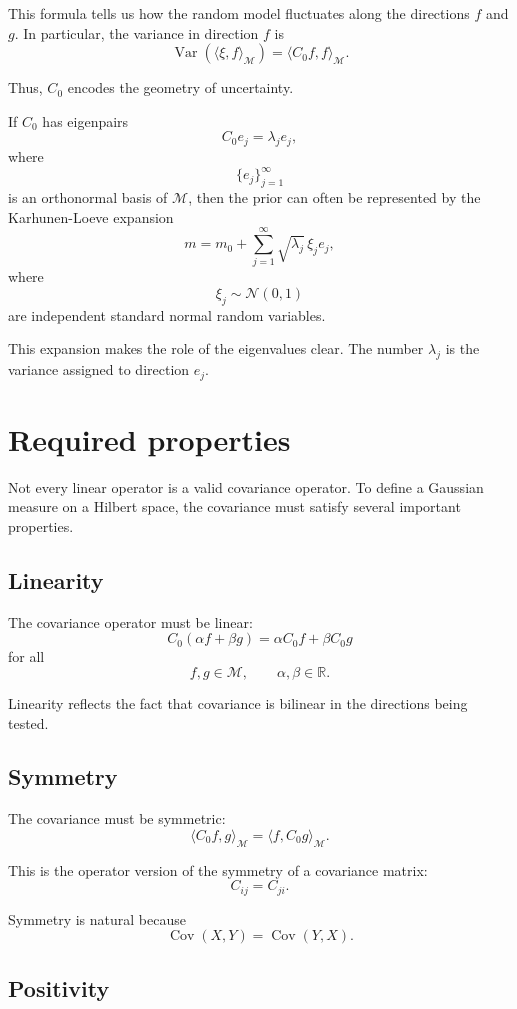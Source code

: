 \documentclass[11pt,a4paper]{book}
\newcommand{\M}{\mathcal{M}}      %
\newcommand{\R}{\mathbb{R}}
\begin{document}
This formula tells us how the random model fluctuates along the directions
$f$ and $g$. In particular, the variance in direction $f$ is
\[
    \operatorname{Var}(\langle \xi,f\rangle_{\M})
    =
    \langle C_0 f,f\rangle_{\M}.
\]

Thus, $C_0$ encodes the geometry of uncertainty.

If $C_0$ has eigenpairs
\[
    C_0 e_j = \lambda_j e_j,
\]
where
\[
    \{e_j\}_{j=1}^{\infty}
\]
is an orthonormal basis of $\M$, then the prior can often be represented by the
Karhunen-Loeve expansion
\[
    m
    =
    m_0
    +
    \sum_{j=1}^{\infty}
    \sqrt{\lambda_j}\,\xi_j e_j,
\]
where
\[
    \xi_j\sim\mathcal{N}(0,1)
\]
are independent standard normal random variables.

This expansion makes the role of the eigenvalues clear. The number
$\lambda_j$ is the variance assigned to direction $e_j$.

\section{Required properties}

Not every linear operator is a valid covariance operator. To define a Gaussian
measure on a Hilbert space, the covariance must satisfy several important
properties.

\subsection{Linearity}

The covariance operator must be linear:
\[
    C_0(\alpha f+\beta g)
    =
    \alpha C_0f+\beta C_0g
\]
for all
\[
    f,g\in\M,
    \qquad
    \alpha,\beta\in\R.
\]

Linearity reflects the fact that covariance is bilinear in the directions being
tested.

\subsection{Symmetry}

The covariance must be symmetric:
\[
    \langle C_0 f,g\rangle_{\M}
    =
    \langle f,C_0 g\rangle_{\M}.
\]

This is the operator version of the symmetry of a covariance matrix:
\[
    C_{ij}=C_{ji}.
\]

Symmetry is natural because
\[
    \operatorname{Cov}(X,Y)
    =
    \operatorname{Cov}(Y,X).
\]

\subsection{Positivity}
\end{document}
